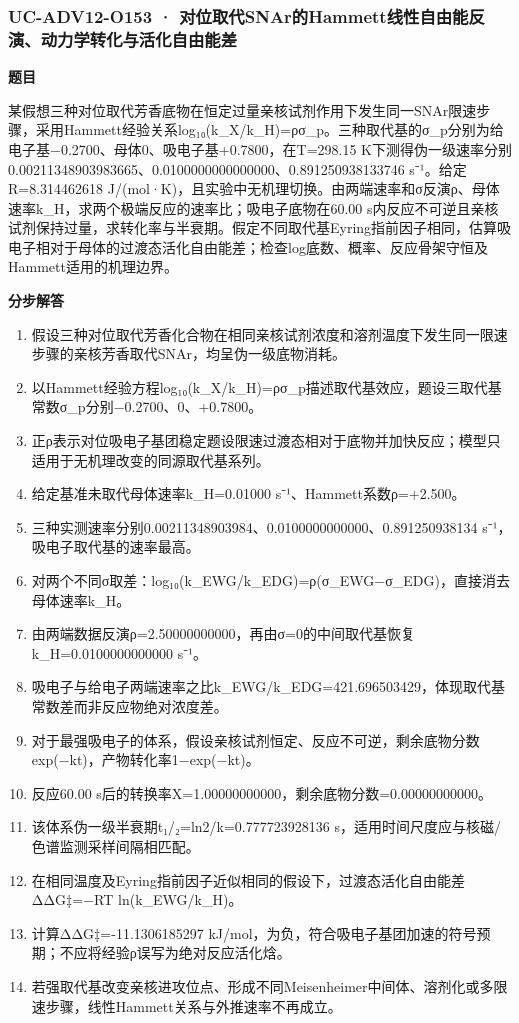 \documentclass[UTF8,11pt,a4paper]{ctexart}
\begin{document}
\subsubsection*{UC-ADV12-O153 · 对位取代SNAr的Hammett线性自由能反演、动力学转化与活化自由能差}
\noindent\textbf{题目}\par
某假想三种对位取代芳香底物在恒定过量亲核试剂作用下发生同一SNAr限速步骤，采用Hammett经验关系log₁₀(k\_X/k\_H)=ρσ\_p。三种取代基的σ\_p分别为给电子基−0.2700、母体0、吸电子基+0.7800，在T=298.15 K下测得伪一级速率分别0.00211348903983665、0.0100000000000000、0.891250938133746 s⁻¹。给定R=8.314462618 J/(mol·K)，且实验中无机理切换。由两端速率和σ反演ρ、母体速率k\_H，求两个极端反应的速率比；吸电子底物在60.00 s内反应不可逆且亲核试剂保持过量，求转化率与半衰期。假定不同取代基Eyring指前因子相同，估算吸电子相对于母体的过渡态活化自由能差；检查log底数、概率、反应骨架守恒及Hammett适用的机理边界。\par
\medskip\noindent\textbf{分步解答}
\begin{enumerate}
\item 假设三种对位取代芳香化合物在相同亲核试剂浓度和溶剂温度下发生同一限速步骤的亲核芳香取代SNAr，均呈伪一级底物消耗。
\item 以Hammett经验方程log₁₀(k\_X/k\_H)=ρσ\_p描述取代基效应，题设三取代基常数σ\_p分别−0.2700、0、+0.7800。
\item 正ρ表示对位吸电子基团稳定题设限速过渡态相对于底物并加快反应；模型只适用于无机理改变的同源取代基系列。
\item 给定基准未取代母体速率k\_H=0.01000 s⁻¹、Hammett系数ρ=+2.500。
\item 三种实测速率分别0.00211348903984、0.0100000000000、0.891250938134 s⁻¹，吸电子取代基的速率最高。
\item 对两个不同σ取差：log₁₀(k\_EWG/k\_EDG)=ρ(σ\_EWG−σ\_EDG)，直接消去母体速率k\_H。
\item 由两端数据反演ρ=2.50000000000，再由σ=0的中间取代基恢复k\_H=0.0100000000000 s⁻¹。
\item 吸电子与给电子两端速率之比k\_EWG/k\_EDG=421.696503429，体现取代基常数差而非反应物绝对浓度差。
\item 对于最强吸电子的体系，假设亲核试剂恒定、反应不可逆，剩余底物分数exp(−kt)，产物转化率1−exp(−kt)。
\item 反应60.00 s后的转换率X=1.00000000000，剩余底物分数=0.00000000000。
\item 该体系伪一级半衰期t₁/₂=ln2/k=0.777723928136 s，适用时间尺度应与核磁/色谱监测采样间隔相匹配。
\item 在相同温度及Eyring指前因子近似相同的假设下，过渡态活化自由能差ΔΔG‡=−RT ln(k\_EWG/k\_H)。
\item 计算ΔΔG‡=-11.1306185297 kJ/mol，为负，符合吸电子基团加速的符号预期；不应将经验ρ误写为绝对反应活化焓。
\item 若强取代基改变亲核进攻位点、形成不同Meisenheimer中间体、溶剂化或多限速步骤，线性Hammett关系与外推速率不再成立。
\end{enumerate}
\end{document}
